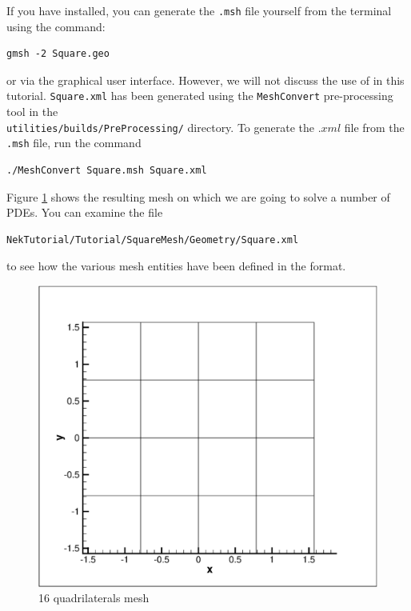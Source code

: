 \documentclass[a4paper,12pt]{article}
\begin{document}
If you have \gmsh installed, you can generate the \texttt{.msh} file yourself
from the terminal using the command:

\begin{verbatim}
gmsh -2 Square.geo
\end{verbatim}

or via the graphical user interface. However, we will not discuss the use of
\gmsh in this tutorial. \texttt{Square.xml} has been generated using the
\texttt{MeshConvert} pre-processing tool in the \\
\texttt{utilities/builds/PreProcessing/} directory. To generate the $.xml$ file
from the \texttt{.msh} file, run the command

\begin{verbatim}
./MeshConvert Square.msh Square.xml
\end{verbatim}

Figure \ref{fig:Mesh} shows the resulting mesh on which we are going to
solve a number of PDEs. You can examine the file

\begin{verbatim}
NekTutorial/Tutorial/SquareMesh/Geometry/Square.xml
\end{verbatim}

to see how the various mesh entities have been defined in the \nektar format.

\begin{figure}
\centering
\includegraphics[scale=0.35]{mesh.eps}
\caption{16 quadrilaterals mesh}
\label{fig:Mesh}
\end{figure}
\end{document}

